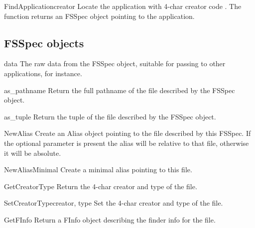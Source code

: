 \begin{funcdesc}{FindApplication}{creator}
Locate the application with 4-char creator code . The
function returns an FSSpec object pointing to the application.
\end{funcdesc}

\subsection{FSSpec objects}

\begin{datadesc}{data}
The raw data from the FSSpec object, suitable for passing
to other applications, for instance.
\end{datadesc}

\begin{funcdesc}{as_pathname}{}
Return the full pathname of the file described by the FSSpec object.
\end{funcdesc}

\begin{funcdesc}{as_tuple}{}
Return the  tuple of the file described
by the FSSpec object.
\end{funcdesc}

\begin{funcdesc}{NewAlias}{}
Create an Alias object pointing to the file described by this
FSSpec. If the optional  parameter is present the alias
will be relative to that file, otherwise it will be absolute.
\end{funcdesc}

\begin{funcdesc}{NewAliasMinimal}{}
Create a minimal alias pointing to this file.
\end{funcdesc}

\begin{funcdesc}{GetCreatorType}{}
Return the 4-char creator and type of the file.
\end{funcdesc}

\begin{funcdesc}{SetCreatorType}{creator, type}
Set the 4-char creator and type of the file.
\end{funcdesc}

\begin{funcdesc}{GetFInfo}{}
Return a FInfo object describing the finder info for the file.
\end{funcdesc}

